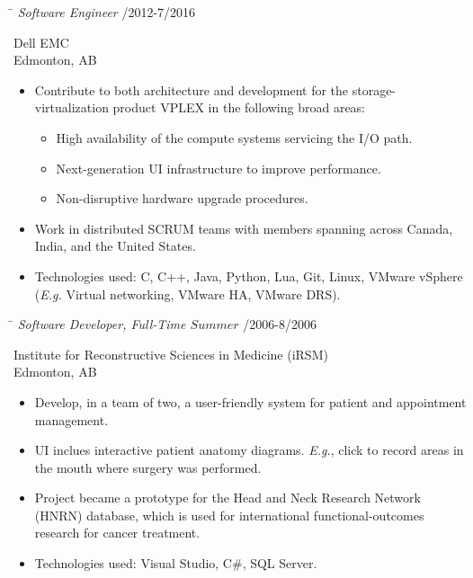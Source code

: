 \documentclass{res}
\begin{document}
\begin{resume}
    \vspace{-0.1in}
    \begin{tabbing}
    \hspace{5.15in}\= \kill  %
    \textit{Software Engineer} /2012-7/2016
    \end{tabbing}\vspace{-22pt}  %
    Dell EMC\\
    Edmonton, AB\\
    \vspace{-2.5ex}\begin{itemize}[noitemsep]
    \item Contribute to both architecture and development for the storage-virtualization product VPLEX in the following broad areas:
    \begin{itemize}[noitemsep]
    \item High availability of the compute systems servicing the I/O path.
    \item Next-generation UI infrastructure to improve performance.
    \item Non-disruptive hardware upgrade procedures.
    \end{itemize}
    \item Work in distributed SCRUM teams with members spanning across Canada, India, and the United States.
    \item Technologies used: C, C++, Java, Python, Lua, Git, Linux, VMware vSphere (\textit{E.g.} Virtual networking, VMware HA, VMware DRS).
    \end{itemize}

    \vspace{-0.1in}
    \begin{tabbing}
    \hspace{5.15in}\= \kill  %
    \textit{Software Developer, Full-Time \(Summer\)} /2006-8/2006
    \end{tabbing}\vspace{-22pt}  %
    Institute for Reconstructive Sciences in Medicine (iRSM)\\
    Edmonton, AB\\
    \vspace{-2.5ex}\begin{itemize}[noitemsep]
    \item Develop, in a team of two, a user-friendly system for patient and appointment management.
    \item UI inclues interactive patient anatomy diagrams.  \textit{E.g.}, click to record areas in the mouth where surgery was performed.
    \item Project became a prototype for the Head and Neck Research Network (HNRN) database, which is used for international functional-outcomes research for cancer treatment.
    \item Technologies used: Visual Studio, C\#, SQL Server.
    \end{itemize}



\end{resume}
\end{document}
